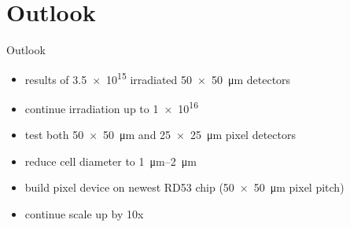 \section{Outlook}
\begin{frame}{Outlook}

	\begin{minipage}[c][5cm]{\textwidth}
		\begin{itemize}\itemfill
			\item results of \SI{3.5e15}{\ncm} irradiated \SI{50x50}{\micro\meter} detectors
			\item continue irradiation up to \SI{1e16}{\ncm}
			\item test both \SI{50x50}{\micro\meter} and \SI{25x25}{\micro\meter} pixel detectors
			\item reduce cell diameter to \SIrange{1}{2}{\micro\meter}
			\item build pixel device on newest RD53 chip (\SI{50x50}{\micro\meter} pixel pitch)
			\item continue scale up by 10x
		\end{itemize}
	\end{minipage}
	
\end{frame}
